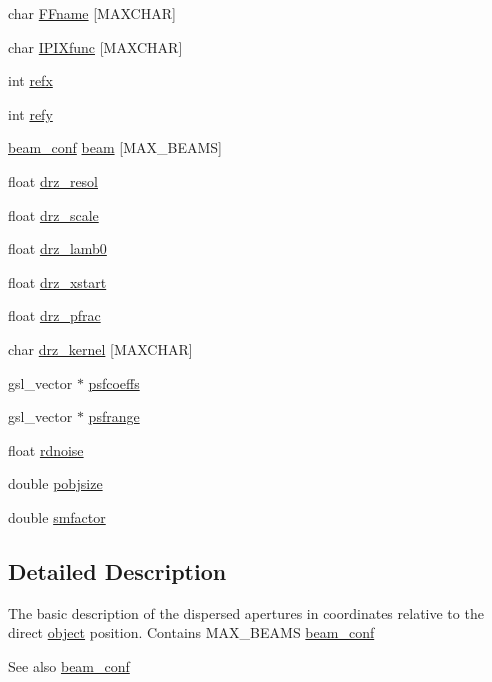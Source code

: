 \begin{DoxyCompactItemize}
\item 
char \hyperlink{structaperture__conf_a305a2c06c10c326f6d8a861ad4948b9c}{FFname} \mbox{[}MAXCHAR\mbox{]}
\item 
char \hyperlink{structaperture__conf_abd4afca5db665d4f5001ce8ba0cf7395}{IPIXfunc} \mbox{[}MAXCHAR\mbox{]}
\item 
int \hyperlink{structaperture__conf_a5cdddf8dafb95b7a77458fbdbf74e5b9}{refx}
\item 
int \hyperlink{structaperture__conf_ae48467c471e66355a90db41d8ce77bc6}{refy}
\item 
\hyperlink{structbeam__conf}{beam\_\-conf} \hyperlink{structaperture__conf_aa1f52d8496707cab4631dc2369d3dec2}{beam} \mbox{[}MAX\_\-BEAMS\mbox{]}
\item 
float \hyperlink{structaperture__conf_a0fb034d1b39c351699420312b2c58d76}{drz\_\-resol}
\item 
float \hyperlink{structaperture__conf_a8605f6fcd19c18d7b30c7a0a11a80e4b}{drz\_\-scale}
\item 
float \hyperlink{structaperture__conf_a6ef4ef7172cdee4e54e27fc5c648a7f2}{drz\_\-lamb0}
\item 
float \hyperlink{structaperture__conf_a7d7bf7ed2754c7f93315ae89a783f547}{drz\_\-xstart}
\item 
float \hyperlink{structaperture__conf_a7eaf9f74b020a37036f7aa141ed73e4f}{drz\_\-pfrac}
\item 
char \hyperlink{structaperture__conf_a0fef1b7eeba1df96f9a5c601baa46558}{drz\_\-kernel} \mbox{[}MAXCHAR\mbox{]}
\item 
gsl\_\-vector $\ast$ \hyperlink{structaperture__conf_a904a154040bedf410b669b65791c96e2}{psfcoeffs}
\item 
gsl\_\-vector $\ast$ \hyperlink{structaperture__conf_a469dc826e363a3b9e340aa99824e2f30}{psfrange}
\item 
float \hyperlink{structaperture__conf_a13683d2e63f2e2ccb4f834dec5b2d0e3}{rdnoise}
\item 
double \hyperlink{structaperture__conf_a981e8e9f63a913f1ac34c864ec392024}{pobjsize}
\item 
double \hyperlink{structaperture__conf_aca74009eb7d64af0ba7222e9dbb879c1}{smfactor}
\end{DoxyCompactItemize}


\subsection{Detailed Description}
The basic description of the dispersed apertures in coordinates relative to the direct \hyperlink{structobject}{object} position. Contains MAX\_\-BEAMS \hyperlink{structbeam__conf}{beam\_\-conf} \begin{DoxySeeAlso}{See also}
\hyperlink{structbeam__conf}{beam\_\-conf} 
\end{DoxySeeAlso}


